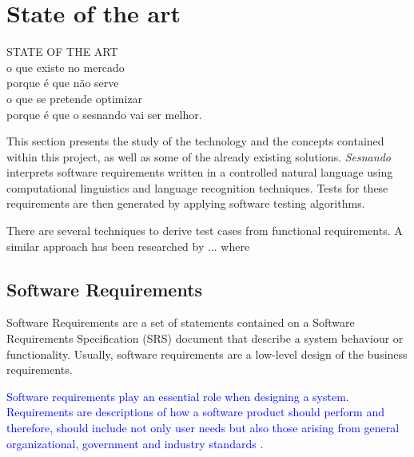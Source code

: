 \chapter{State of the art}
\label{ch:sotart}

STATE OF THE ART\\
o que existe no mercado\\
porque é que não serve\\
o que se pretende optimizar\\
porque é que o sesnando vai ser melhor.


This section presents the study of the technology and the concepts contained within this project, as well as some of the already existing solutions. \textit{Sesnando} interprets software requirements written in a controlled natural language using computational linguistics and language recognition techniques. Tests for these requirements are then generated by applying software testing algorithms.

There are several techniques to derive test cases from functional
requirements. A similar approach has been researched by ... where









\section{Software Requirements}
\label{sec:software_requirements}

Software Requirements are a set of statements contained on a Software Requirements Specification (SRS) document that describe a system behaviour or functionality. Usually, software requirements are a low-level design of the business requirements. 

\textcolor{blue}{Software requirements play an essential role when designing a system. Requirements are descriptions of how a software product should perform and therefore, should include not only user needs but also those arising from general organizational, government and industry standards \cite{aurum_engineering_2005}.}

